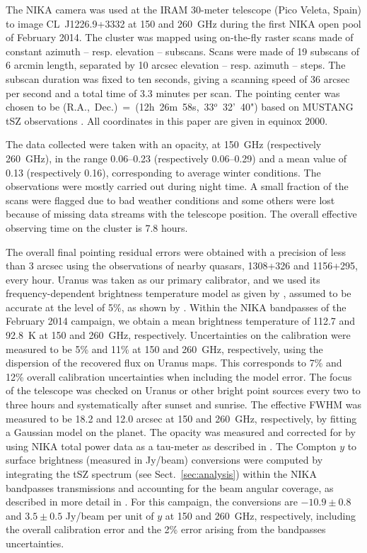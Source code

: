 \documentclass[twocolumn,traditabstract]{aa}
\begin{document}
The NIKA camera was used at the IRAM 30-meter telescope (Pico Veleta, Spain) to image \mbox{CL~J1226.9+3332} at 150 and 260~GHz during the first NIKA open pool of February 2014. The cluster was mapped using on-the-fly raster scans made of constant azimuth -- resp. elevation -- subscans. Scans were made of 19 subscans of 6 arcmin length, separated by 10 arcsec elevation -- resp. azimuth -- steps. The subscan duration was fixed to ten seconds, giving a scanning speed of 36 arcsec per second and a total time of 3.3 minutes per scan. The pointing center was chosen to be (R.A.,~Dec.)~=~(12h~26m~58s,~33$^o$~32'~40") based on MUSTANG tSZ observations \citep{korngut2011}. All coordinates in this paper are given in equinox 2000.

The data collected were taken with an opacity, at 150~GHz (respectively 260~GHz), in the range 0.06--0.23 (respectively 0.06--0.29) and a mean value of 0.13 (respectively 0.16), corresponding to average winter conditions. The observations were mostly carried out during night time. A small fraction of the scans were flagged due to bad weather conditions and some others were lost because of missing data streams with the telescope position. The overall effective observing time on the cluster is 7.8 hours.

The overall final pointing residual errors were obtained with a precision of less than 3 arcsec using the observations of nearby quasars, 1308+326 and 1156+295, every hour. Uranus was taken as our primary calibrator, and we used its frequency-dependent brightness temperature model as given by \cite{moreno2010}, assumed to be accurate at the level of 5\%, as shown by \cite{planck2013calib}. Within the NIKA bandpasses of the February 2014 campaign, we obtain a mean brightness temperature of 112.7 and 92.8~K at 150 and 260~GHz, respectively. Uncertainties on the calibration were measured to be 5\% and 11\% at 150 and 260~GHz, respectively, using the dispersion of the recovered flux on Uranus maps. This corresponds to 7\% and 12\% overall calibration uncertainties when including the model error. The focus of the telescope was checked on Uranus or other bright point sources every two to three hours and systematically after sunset and sunrise. The effective FWHM was measured to be 18.2 and 12.0 arcsec at 150 and 260~GHz, respectively, by fitting a Gaussian model on the planet. The opacity was measured and corrected for by using NIKA total power data as a tau-meter as described in \cite{catalano2014}. The Compton $y$ to surface brightness (measured in Jy/beam) conversions were computed by integrating the tSZ spectrum (see Sect.~\ref{sec:analysis}) within the NIKA bandpasses transmissions and accounting for the beam angular coverage, as described in more detail in \cite{adam2013}. For this campaign, the conversions are $-10.9 \pm 0.8$ and $3.5 \pm 0.5$ Jy/beam per unit of $y$ at 150 and 260~GHz, respectively, including the overall calibration error and the 2\% error arising from the bandpasses uncertainties.
\end{document}
